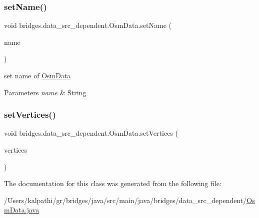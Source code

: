 \subsubsection{\texorpdfstring{setName()}{setName()}}
{\footnotesize\ttfamily void bridges.\+data\+\_\+src\+\_\+dependent.\+Osm\+Data.\+set\+Name (\begin{DoxyParamCaption}\item[{String}]{name }\end{DoxyParamCaption})}

set name of \mbox{\hyperlink{classbridges_1_1data__src__dependent_1_1_osm_data}{Osm\+Data}} 
\begin{DoxyParams}{Parameters}
{\em name} & String \\
\hline
\end{DoxyParams}
\mbox{\label{classbridges_1_1data__src__dependent_1_1_osm_data_ad31b467d79dd0b76f75f93b5e192e1e3}} 
\subsubsection{\texorpdfstring{setVertices()}{setVertices()}}
{\footnotesize\ttfamily void bridges.\+data\+\_\+src\+\_\+dependent.\+Osm\+Data.\+set\+Vertices (\begin{DoxyParamCaption}\item[{\mbox{\hyperlink{classbridges_1_1data__src__dependent_1_1_osm_vertex}{Osm\+Vertex}} \mbox{[}$\,$\mbox{]}}]{vertices }\end{DoxyParamCaption})}



The documentation for this class was generated from the following file\+:\begin{DoxyCompactItemize}
\item 
/\+Users/kalpathi/gr/bridges/java/src/main/java/bridges/data\+\_\+src\+\_\+dependent/\mbox{\hyperlink{_osm_data_8java}{Osm\+Data.\+java}}\end{DoxyCompactItemize}
